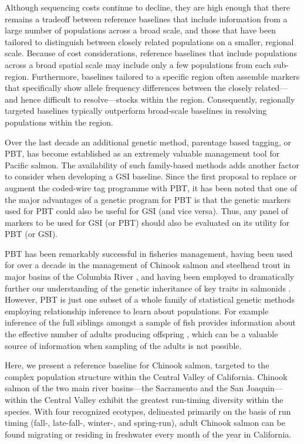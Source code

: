 Although sequencing costs continue to decline, they are high enough
that there remains a tradeoff
between reference baselines that include information from a large number of
populations across a broad scale, and those that have been tailored
to distinguish between closely related populations on a smaller, regional scale.
Because of cost considerations, reference baselines that include populations across a broad 
spatial scale may include only a few populations from each sub-region.  Furthermore,
baselines tailored to a specific region often assemble markers that specifically
show allele frequency differences between the closely related---and hence difficult
to resolve---stocks within the region.  Consequently, regionally targeted baselines typically
outperform broad-scale baselines in resolving populations within the region.

Over the last decade an additional genetic method, parentage based tagging, or PBT,
\citep{anderson2005description,steele2019parentage}
has become established as an extremely valuable management
tool for Pacific salmon.  The availability of such family-based methods adds another factor to
consider when developing a GSI baseline.
Since the first proposal \citep{anderson2005description} to replace or augment the coded-wire tag
programme \citep{nandor2010overview}
with PBT, it has been noted that one of the major advantages of a genetic program for
PBT is that the genetic markers used for PBT could also be useful for GSI (and
vice versa).  
Thus, any panel of markers to be used for GSI (or PBT) should also be evaluated on its
utility for PBT (or GSI).

PBT has been remarkably successful in fisheries
management, having been used for over a decade in the management of Chinook salmon
and steelhead trout in major basins of the Columbia River \cite{steele2019parentage,horn2023multigeneration}, and having been employed to dramatically further our
understanding of the genetic inheritance of key traits in salmonids
\citep{abadia2013large,beulke2023distinct}. However, PBT is just one subset of a whole
family of statistical genetic methods employing relationship inference to learn about
populations.  For example inference of the full siblings amongst a sample of fish
provides information about the effective number of adults producing offspring
\citep{waples2011inbreeding,wang2023estimating}, which can
be a valuable source of information when sampling of the adults is not possible.  


Here, we present a reference baseline for Chinook salmon, targeted to the complex population 
structure within the Central Valley of California. Chinook salmon of the two main river basins---the 
Sacramento and the San Joaquin---within the Central Valley exhibit the greatest run-timing diversity
within the species.  With four recognized ecotypes, delineated primarily on the basis of run timing
(fall-, late-fall-, winter-, and spring-run), adult Chinook salmon can be found migrating or residing
in freshwater every month of the year in California. 

